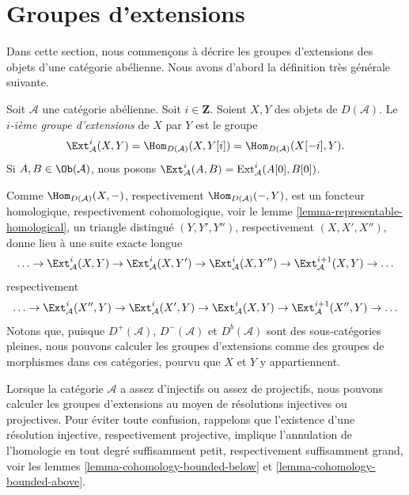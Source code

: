 \section{Groupes d'extensions}
\label{section-ext}

\noindent
Dans cette section, nous commençons à décrire les groupes d'extensions des
objets d'une catégorie abélienne. Nous avons d'abord la définition très
générale suivante.

\begin{definition}
\label{definition-ext}
Soit $\mathcal{A}$ une catégorie abélienne. Soit $i \in \mathbf{Z}$. Soient
$X, Y$ des objets de $D(\mathcal{A})$. Le {\it $i$-ième groupe d'extensions}
de $X$ par $Y$ est le groupe
$$
\Ext^i_\mathcal{A}(X, Y) =
\Hom_{D(\mathcal{A})}(X, Y[i]) =
\Hom_{D(\mathcal{A})}(X[-i], Y).
$$
Si $A, B \in \Ob(\mathcal{A})$, nous posons
$\Ext^i_\mathcal{A}(A, B) = \text{Ext}^i_\mathcal{A}(A[0], B[0])$.
\end{definition}

\noindent
Comme $\Hom_{D(\mathcal{A})}(X, -)$, respectivement
$\Hom_{D(\mathcal{A})}(-, Y)$, est un foncteur homologique, respectivement
cohomologique, voir le lemme \ref{lemma-representable-homological}, un triangle
distingué $(Y, Y', Y'')$, respectivement $(X, X', X'')$, donne lieu à une
suite exacte longue
$$
\ldots \to
\Ext^i_\mathcal{A}(X, Y) \to
\Ext^i_\mathcal{A}(X, Y') \to
\Ext^i_\mathcal{A}(X, Y'') \to
\Ext^{i + 1}_\mathcal{A}(X, Y) \to \ldots
$$
respectivement
$$
\ldots \to
\Ext^i_\mathcal{A}(X'', Y) \to
\Ext^i_\mathcal{A}(X', Y) \to
\Ext^i_\mathcal{A}(X, Y) \to
\Ext^{i + 1}_\mathcal{A}(X'', Y) \to \ldots
$$
Notons que, puisque $D^+(\mathcal{A})$, $D^-(\mathcal{A})$ et
$D^b(\mathcal{A})$ sont des sous-catégories pleines, nous pouvons calculer
les groupes d'extensions comme des groupes de morphismes dans ces catégories,
pourvu que $X$ et $Y$ y appartiennent.

\medskip\noindent
Lorsque la catégorie $\mathcal{A}$ a assez d'injectifs ou assez de projectifs,
nous pouvons calculer les groupes d'extensions au moyen de résolutions
injectives ou projectives. Pour éviter toute confusion, rappelons que
l'existence d'une résolution injective, respectivement projective, implique
l'annulation de l'homologie en tout degré suffisamment petit, respectivement
suffisamment grand, voir les lemmes
\ref{lemma-cohomology-bounded-below} et
\ref{lemma-cohomology-bounded-above}.

